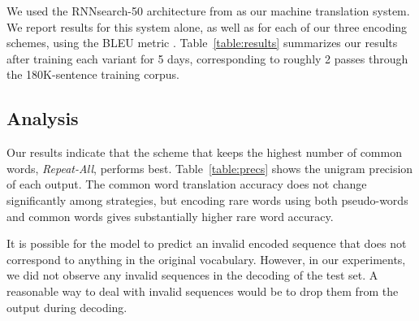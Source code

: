 We used the RNNsearch-50 architecture from 
as our machine translation system. We report results for this system alone, as
well as for each of our three encoding schemes, using the BLEU metric
\cite{bleu}. Table~\ref{table:results} summarizes our results after training
each variant for 5 days, corresponding to roughly 2 passes through the
180K-sentence training corpus.


\subsection{Analysis}

\begin{table}
  \centering
  \vspace{8pt}
  \caption{Test set precision (\%) on common words and rare words for each encoding strategy.}
  \label{table:precs}
\end{table}

Our results indicate that the scheme that keeps the highest number of common
words, \emph{Repeat-All}, performs best. Table~\ref{table:precs} shows the
unigram precision of each output. The common word translation accuracy does not
change significantly among strategies, but encoding rare words using both
pseudo-words and common words gives substantially higher rare word accuracy.

It is possible for the model to predict an invalid encoded sequence that does
not correspond to anything in the original vocabulary. However, in our experiments,
we did not observe any invalid sequences in the decoding of the test set. A reasonable
way to deal with invalid sequences would be to drop them from the output during decoding.


